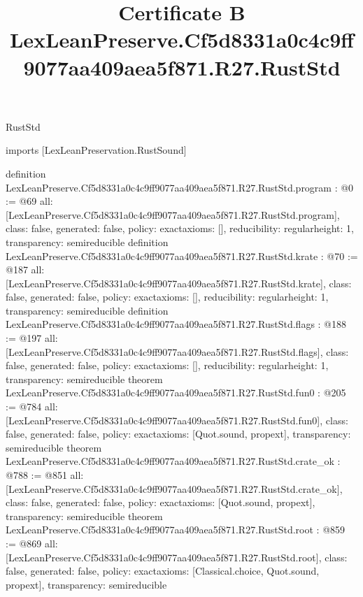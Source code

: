 \begin{lexlean}{RustStd}
\title{Certificate B LexLeanPreserve.Cf5d8331a0c4c9ff9077aa409aea5f871.R27.RustStd}
\begin{coremodule}
imports [LexLeanPreservation.RustSound]

definition LexLeanPreserve.Cf5d8331a0c4c9ff9077aa409aea5f871.R27.RustStd.program : @0 := @69 {
  all: [LexLeanPreserve.Cf5d8331a0c4c9ff9077aa409aea5f871.R27.RustStd.program],
  class: false,
  generated: false,
  policy: exact{axioms: []},
  reducibility: regular{height: 1},
  transparency: semireducible
}
definition LexLeanPreserve.Cf5d8331a0c4c9ff9077aa409aea5f871.R27.RustStd.krate : @70 := @187 {
  all: [LexLeanPreserve.Cf5d8331a0c4c9ff9077aa409aea5f871.R27.RustStd.krate],
  class: false,
  generated: false,
  policy: exact{axioms: []},
  reducibility: regular{height: 1},
  transparency: semireducible
}
definition LexLeanPreserve.Cf5d8331a0c4c9ff9077aa409aea5f871.R27.RustStd.flags : @188 := @197 {
  all: [LexLeanPreserve.Cf5d8331a0c4c9ff9077aa409aea5f871.R27.RustStd.flags],
  class: false,
  generated: false,
  policy: exact{axioms: []},
  reducibility: regular{height: 1},
  transparency: semireducible
}
theorem LexLeanPreserve.Cf5d8331a0c4c9ff9077aa409aea5f871.R27.RustStd.fun0 : @205 := @784 {
  all: [LexLeanPreserve.Cf5d8331a0c4c9ff9077aa409aea5f871.R27.RustStd.fun0],
  class: false,
  generated: false,
  policy: exact{axioms: [Quot.sound, propext]},
  transparency: semireducible
}
theorem LexLeanPreserve.Cf5d8331a0c4c9ff9077aa409aea5f871.R27.RustStd.crate_ok : @788 := @851 {
  all: [LexLeanPreserve.Cf5d8331a0c4c9ff9077aa409aea5f871.R27.RustStd.crate_ok],
  class: false,
  generated: false,
  policy: exact{axioms: [Quot.sound, propext]},
  transparency: semireducible
}
theorem LexLeanPreserve.Cf5d8331a0c4c9ff9077aa409aea5f871.R27.RustStd.root : @859 := @869 {
  all: [LexLeanPreserve.Cf5d8331a0c4c9ff9077aa409aea5f871.R27.RustStd.root],
  class: false,
  generated: false,
  policy: exact{axioms: [Classical.choice, Quot.sound, propext]},
  transparency: semireducible
}


\end{coremodule}
\end{lexlean}
